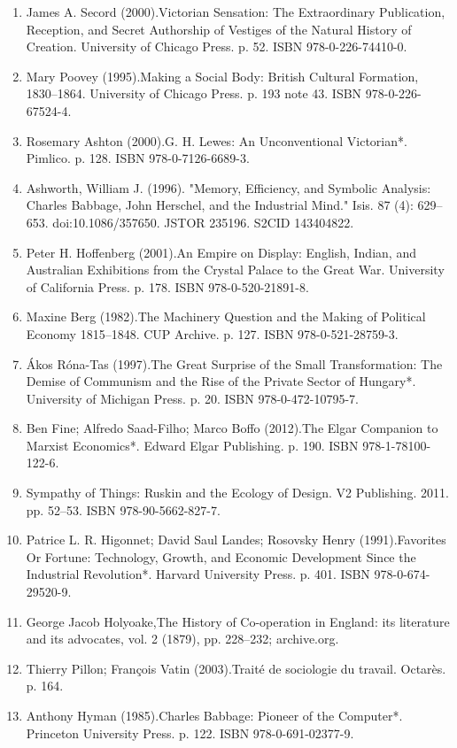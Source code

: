\begin{enumerate}
\item James A. Secord (2000).Victorian Sensation: The Extraordinary Publication, Reception, and Secret Authorship of Vestiges of the Natural History of Creation. University of Chicago Press. p. 52. ISBN 978-0-226-74410-0.
\item Mary Poovey (1995).Making a Social Body: British Cultural Formation, 1830–1864. University of Chicago Press. p. 193 note 43. ISBN 978-0-226-67524-4.
\item Rosemary Ashton (2000).G. H. Lewes: An Unconventional Victorian*. Pimlico. p. 128. ISBN 978-0-7126-6689-3.
\item Ashworth, William J. (1996). "Memory, Efficiency, and Symbolic Analysis: Charles Babbage, John Herschel, and the Industrial Mind." Isis. 87 (4): 629–653. doi:10.1086/357650. JSTOR 235196. S2CID 143404822.
\item Peter H. Hoffenberg (2001).An Empire on Display: English, Indian, and Australian Exhibitions from the Crystal Palace to the Great War. University of California Press. p. 178. ISBN 978-0-520-21891-8.
\item Maxine Berg (1982).The Machinery Question and the Making of Political Economy 1815–1848. CUP Archive. p. 127. ISBN 978-0-521-28759-3.
\item Ákos Róna-Tas (1997).The Great Surprise of the Small Transformation: The Demise of Communism and the Rise of the Private Sector of Hungary*. University of Michigan Press. p. 20. ISBN 978-0-472-10795-7.
\item Ben Fine; Alfredo Saad-Filho; Marco Boffo (2012).The Elgar Companion to Marxist Economics*. Edward Elgar Publishing. p. 190. ISBN 978-1-78100-122-6.
\item Sympathy of Things: Ruskin and the Ecology of Design. V2 Publishing. 2011. pp. 52–53. ISBN 978-90-5662-827-7.
\item Patrice L. R. Higonnet; David Saul Landes; Rosovsky Henry (1991).Favorites Or Fortune: Technology, Growth, and Economic Development Since the Industrial Revolution*. Harvard University Press. p. 401. ISBN 978-0-674-29520-9.
\item George Jacob Holyoake,The History of Co-operation in England: its literature and its advocates, vol. 2 (1879), pp. 228–232; archive.org.
\item Thierry Pillon; François Vatin (2003).Traité de sociologie du travail. Octarès. p. 164.
\item Anthony Hyman (1985).Charles Babbage: Pioneer of the Computer*. Princeton University Press. p. 122. ISBN 978-0-691-02377-9.

\end{enumerate}
